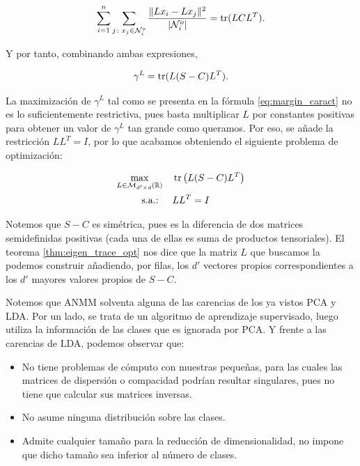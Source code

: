 \begin{equation*}
    \sum_{i=1}^n\sum\limits_{j \colon x_j \in \mathcal{N}_i^o} \frac{\|Lx_i - Lx_j \|^2}{|\mathcal{N}_i^o|} = \operatorname{tr}(LCL^T).
\end{equation*}

Y por tanto, combinando ambas expresiones,

\begin{equation} \label{eq:margin_caract}
    \gamma^L = \operatorname{tr}(L(S-C)L^T).
\end{equation}

La maximización de $\gamma^L$ tal como se presenta en la fórmula \ref{eq:margin_caract} no es lo suficientemente restrictiva, pues basta multiplicar $L$ por constantes positivas para obtener un valor de $\gamma^L$ tan grande como queramos. Por eso, se añade la restricción $LL^T = I$, por lo que acabamos obteniendo el siguiente problema de optimización:

\begin{align*}
    \max_{L \in \mathcal{M}_{d'\times d}(\mathbb{R})} &\quad \operatorname{tr}\left(L(S-C)L^T\right)  \\
    \text{s.a.: } &\quad LL^T = I
\end{align*}

Notemos que $S - C$ es simétrica, pues es la diferencia de dos matrices semidefinidas positivas (cada una de ellas es suma de productos tensoriales). El teorema \ref{thm:eigen_trace_opt} nos dice que la matriz $L$ que buscamos la podemos construir añadiendo, por filas, los $d'$ vectores propios correspondientes a los $d'$ mayores valores propios de $S-C$.

Notemos que ANMM solventa alguna de las carencias de los ya vistos PCA y LDA. Por un lado, se trata de un algoritmo de aprendizaje supervisado, luego utiliza la información de las clases que es ignorada por PCA. Y frente a las carencias de LDA, podemos observar que:

\begin{itemize}
    \item No tiene problemas de cómputo con muestras pequeñas, para las cuales las matrices de dispersión o compacidad podrían resultar singulares, pues no tiene que calcular sus matrices inversas.
    \item No asume ninguna distribución sobre las clases.
    \item Admite cualquier tamaño para la reducción de dimensionalidad, no impone que dicho tamaño sea inferior al número de clases.
\end{itemize}

